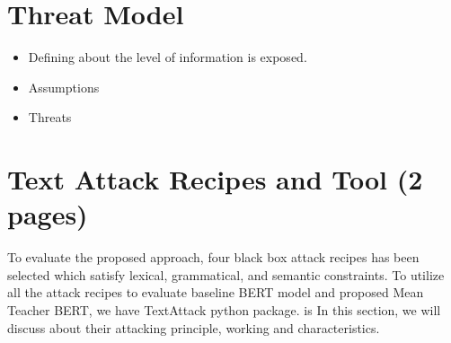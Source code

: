 \documentclass[%
	BCOR=8mm, %
	DIV=12, 
	toc=bibliography, %
	toc=listof, %
	oneside, %
	egregdoesnotlikesansseriftitles, %
	]{scrbook}
\begin{document}
\section{Threat Model}
\begin{itemize}
\item Defining about the level of information is exposed. 
\item Assumptions
\item Threats
\end{itemize}

\section{Text Attack Recipes and Tool (2 pages)}
To evaluate the proposed approach, four black box attack recipes has been selected which satisfy lexical, grammatical, and semantic constraints. To utilize all the attack recipes to evaluate baseline BERT model and proposed Mean Teacher BERT, we have TextAttack python package\cite{morris_textattack_2020}. is  In this section, we will discuss about their attacking principle, working and characteristics. 
\end{document}
